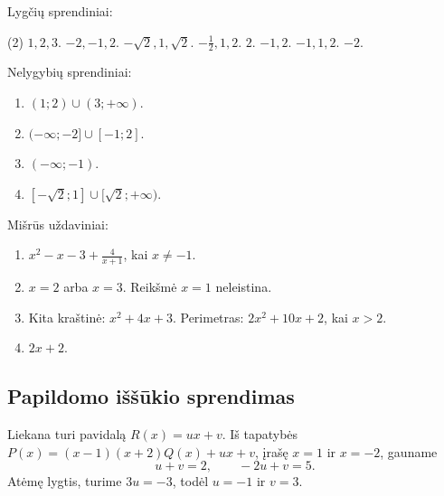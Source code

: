 \documentclass[11pt,a4paper]{scrartcl}
\newcommand{\uzd}[1]{\Needspace{5\baselineskip}\begin{problem}#1\end{problem}}
\begin{document}
\uzd{Lygčių sprendiniai:
\begin{tasks}(2)
\task \(1,2,3\).
\task \(-2,-1,2\).
\task \(-\sqrt2,1,\sqrt2\).
\task \(-\tfrac12,1,2\).
\task \(2\).
\task \(-1,2\).
\task \(-1,1,2\).
\task \(-2\).
\end{tasks}}
\uzd{Nelygybių sprendiniai:
\begin{enumerate}[label=(\arabic*),leftmargin=*,itemsep=.5em]
\item \((1;2)\cup(3;+\infty)\).
\item \((-\infty;-2]\cup[-1;2]\).
\item \((-\infty;-1)\).
\item \([-\sqrt2;1]\cup[\sqrt2;+\infty)\).
\end{enumerate}}
\uzd{Mišrūs uždaviniai:
\begin{enumerate}[label=(\arabic*),leftmargin=*,itemsep=.5em]
\item \(\displaystyle x^2-x-3+\frac4{x+1}\), kai \(x\ne-1\).
\item \(x=2\) arba \(x=3\). Reikšmė \(x=1\) neleistina.
\item Kita kraštinė: \(x^2+4x+3\). Perimetras: \(2x^2+10x+2\), kai \(x>2\).
\item \(2x+2\).
\end{enumerate}}
\subsection*{Papildomo iššūkio sprendimas}
Liekana turi pavidalą \(R(x)=ux+v\). Iš tapatybės
\(P(x)=(x-1)(x+2)Q(x)+ux+v\), įrašę \(x=1\) ir \(x=-2\), gauname
\[u+v=2,\qquad -2u+v=5.\]
Atėmę lygtis, turime \(3u=-3\), todėl \(u=-1\) ir \(v=3\).
\end{document}

